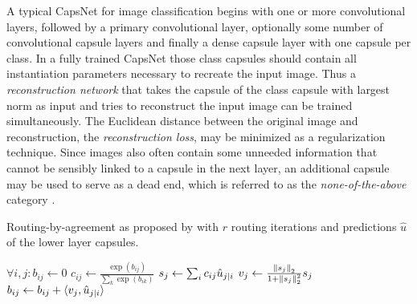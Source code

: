 A typical CapsNet for image classification begins with one or more convolutional layers, followed by a primary convolutional layer, optionally some number of convolutional capsule layers and finally a dense capsule layer with one capsule per class.
In a fully trained CapsNet those class capsules should contain all instantiation parameters necessary to recreate the input image.
Thus a \emph{reconstruction network} that takes the capsule of the class capsule with largest norm as input and tries to reconstruct the input image can be trained simultaneously.
The Euclidean distance between the original image and reconstruction, the \emph{reconstruction loss}, may be minimized as a regularization technique.
Since images also often contain some unneeded information that cannot be sensibly linked to a capsule in the next layer, an additional capsule may be used to serve as a dead end, which is referred to as the \emph{none-of-the-above} category \citep{capsules}.

\begin{algorithm}
\caption[Routing-by-agreement]{Routing-by-agreement as proposed by \citet{capsules} with $r$ routing iterations and predictions $\hat{u}$ of the lower layer capsules.}
\label{alg:routing}
\begin{algorithmic}[1]
	
	\State $\forall i,j: b_{ij} \gets 0$
		\State $c_{ij} \gets \frac{\exp(b_{ij})}{\sum_{k}{\exp(b_{ik})}}$ 
		\State $s_j \gets \sum_{i}{c_{ij}\hat{u}_{j \vert i}}$
		\State $v_j \gets \frac{\left \lVert s_j \right \rVert _{2}}{1 + \left \lVert s_j \right \rVert _{2}^2} s_j$ 
		\State $b_{ij} \gets b_{ij} + \langle v_j, \hat{u}_{j \vert i} \rangle$	
	\EndFor
\EndProcedure
	
\end{algorithmic}
\end{algorithm}
